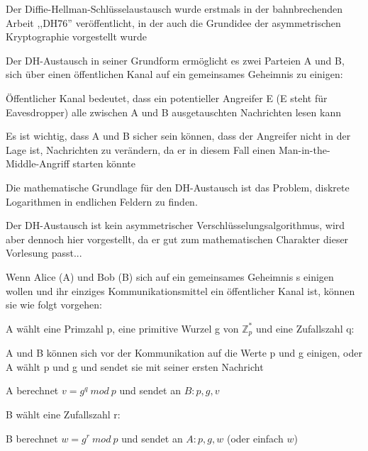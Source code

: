 \documentclass[a4paper]{article}
\begin{document}
\begin{multicols}{3}
      \begin{itemize*}
            \item Der Diffie-Hellman-Schlüsselaustausch wurde erstmals in der
            bahnbrechenden Arbeit ,,DH76'' veröffentlicht, in der auch die
            Grundidee der asymmetrischen Kryptographie vorgestellt wurde
            \item Der DH-Austausch in seiner Grundform ermöglicht es zwei Parteien A und
            B, sich über einen öffentlichen Kanal auf ein gemeinsames Geheimnis zu
            einigen:
            \begin{itemize*}
                  \item Öffentlicher Kanal bedeutet, dass ein potentieller Angreifer E (E steht für Eavesdropper) alle zwischen A und B ausgetauschten Nachrichten lesen kann
                  \item Es ist wichtig, dass A und B sicher sein können, dass der Angreifer nicht in der Lage ist, Nachrichten zu verändern, da er in diesem Fall einen Man-in-the-Middle-Angriff starten könnte
                  \item Die mathematische Grundlage für den DH-Austausch ist das Problem, diskrete Logarithmen in endlichen Feldern zu finden.
                  \item Der DH-Austausch ist kein asymmetrischer Verschlüsselungsalgorithmus, wird aber dennoch hier vorgestellt, da er gut zum mathematischen Charakter dieser Vorlesung passt...
            \end{itemize*}
            \item Wenn Alice (A) und Bob (B) sich auf ein gemeinsames Geheimnis s
            einigen wollen und ihr einziges Kommunikationsmittel ein öffentlicher
            Kanal ist, können sie wie folgt vorgehen:
            \begin{itemize*}
                  \item A wählt eine Primzahl p, eine primitive Wurzel g von $\mathbb{Z}^*_p$ und eine Zufallszahl q:
                  \begin{itemize*} \item A und B können sich vor der Kommunikation auf die Werte p und g einigen, oder A wählt p und g und sendet sie mit seiner ersten Nachricht \item A berechnet $v=g^q\ mod\ p$ und sendet an $B:{p,g,v}$ \end{itemize*}
                  \item B wählt eine Zufallszahl r:
                  \begin{itemize*} \item B berechnet $w=g^r\ mod\ p$ und sendet an $A:{p,g,w}$ (oder einfach ${w}$) \end{itemize*}

\end{itemize*}
\end{itemize*}
\end{multicols}
\end{document}
